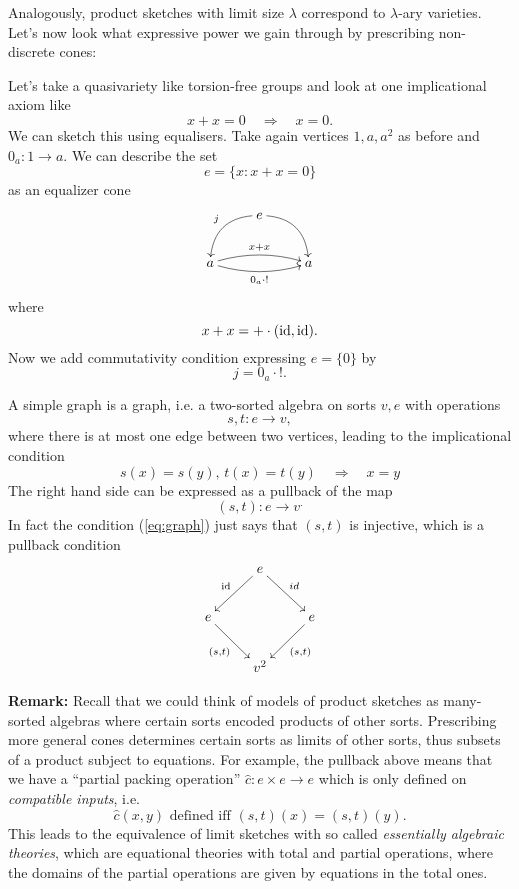 Analogously, product sketches with limit size $\lambda$ correspond to $\lambda$-ary varieties. \\

Let's now look what expressive power we gain through by prescribing non-discrete cones:

\begin{Example}
Let's take a quasivariety like torsion-free groups and look at one implicational axiom like
\[ x + x = 0 \quad \Rightarrow \quad x = 0. \]
We can sketch this using equalisers. Take again vertices $1,a,a^2$ as before and $0_a : 1 \to a$. We can describe the set
\[ e = \{ x : x + x = 0 \} \]
as an equalizer cone
\[
\xymatrix{
& e \ar@/_1pc/[ld]_{j} \ar@/^1pc/[rd] & \\
a \ar@/^/[rr]^{x + x} \ar@/_/[rr]_{0_a \circ !} & & a
}\]
where \[ x + x = + \cdot (\textrm{id},\textrm{id}). \]
Now we add commutativity condition expressing $e = \{0\}$ by \[ j = 0_a\cdot !. \]
\end{Example}

\begin{Example}
A simple graph is a graph, i.e. a two-sorted algebra on sorts $v,e$ with operations
\[ s, t : e \to v, \]
where there is at most one edge between two vertices, leading to the implicational condition
\begin{equation}\label{eq:graph} s(x) = s(y),\, t(x) = t(y) \quad \Rightarrow \quad x = y \end{equation}
The right hand side can be expressed as a pullback of the map \[ (s,t) : e \to v^. \]
In fact the condition (\ref{eq:graph}) just says that $(s,t)$ is injective, which is a pullback condition
\[
\xymatrix{
 & e \ar[ld]_{\id} \ar[rd]^{id} & \\
e \ar[rd]_{(s,t)} &  & e \ar[ld]^{(s,t)} \\
 & v^2 &
}\]
\end{Example}

\textbf{Remark: } Recall that we could think of models of product sketches as many-sorted algebras where certain sorts encoded products of other sorts. Prescribing more general cones determines certain sorts as limits of other sorts, thus subsets of a product subject to equations. For example, the pullback above means that we have a ``partial packing operation'' $\hat c : e \times e \to e$ which is only defined on \emph{compatible inputs}, i.e.
\[ \hat c(x,y) \text{ defined iff } (s,t)(x) = (s,t)(y). \]
This leads to the equivalence of limit sketches with so called \emph{essentially algebraic theories}, which are equational theories with total and partial operations, where the domains of the partial operations are given by equations in the total ones. \\

